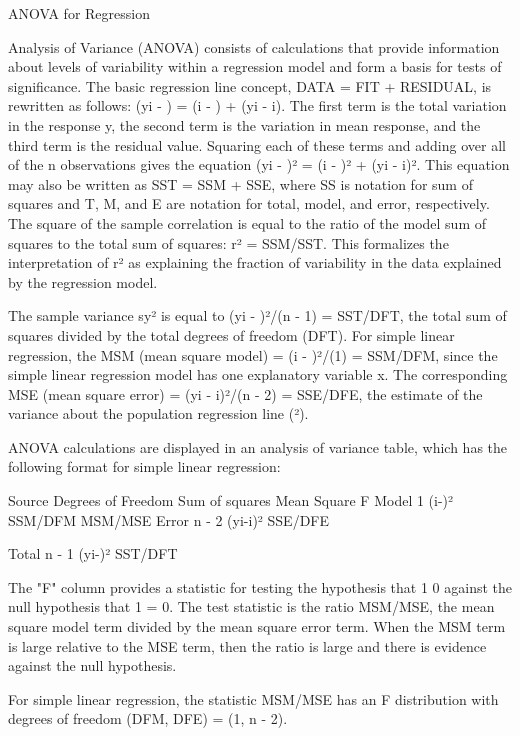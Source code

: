 ANOVA for Regression

Analysis of Variance (ANOVA) consists of calculations that provide information about levels of variability within a regression model and form a basis for tests of significance. The basic regression line concept, DATA = FIT + RESIDUAL, is rewritten as follows: 
(yi - ) = (i - ) + (yi - i). 
The first term is the total variation in the response y, the second term is the variation in mean response, and the third term is the residual value. Squaring each of these terms and adding over all of the n observations gives the equation 
(yi -  )² =  (i -  )² + (yi -  i)². 
This equation may also be written as SST = SSM + SSE, where SS is notation for sum of squares and T, M, and E are notation for total, model, and error, respectively.
The square of the sample correlation is equal to the ratio of the model sum of squares to the total sum of squares: r² = SSM/SST. 
This formalizes the interpretation of r² as explaining the fraction of variability in the data explained by the regression model.

The sample variance sy² is equal to  (yi -  )²/(n - 1) = SST/DFT, the total sum of squares divided by the total degrees of freedom (DFT). 
For simple linear regression, the MSM (mean square model) =  (i -  )²/(1) = SSM/DFM, since the simple linear regression model has one explanatory variable x. 
The corresponding MSE (mean square error) = (yi -  i)²/(n - 2) = SSE/DFE, the estimate of the variance about the population regression line (²).

ANOVA calculations are displayed in an analysis of variance table, which has the following format for simple linear regression:

Source	Degrees of Freedom	Sum of squares		Mean Square	F       
Model		1		(i-)²		      SSM/DFM	MSM/MSE 
Error		n - 2		(yi-i)²			SSE/DFE		
																						
Total		n - 1		(yi-)²			SST/DFT	


The "F" column provides a statistic for testing the hypothesis that
1 0
against the null hypothesis that 1 = 0.
The test statistic is the ratio MSM/MSE, the mean square model term divided
by the mean square error term.  When the MSM term is large relative to
the MSE term, then the ratio is large and there is evidence against the
null hypothesis.  

For simple linear regression, the statistic MSM/MSE has an 
F distribution with degrees of freedom (DFM, DFE) = 
(1, n - 2).




